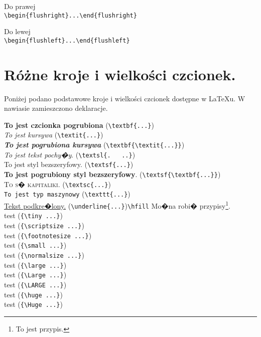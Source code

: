 \documentclass[11pt,wide]{mwart}
\begin{document}
\begin{flushright}
Do prawej\\
\verb"\begin{flushright}...\end{flushright}"
\end{flushright}

\begin{flushleft}
Do lewej\\
\verb"\begin{flushleft}...\end{flushleft}"
\end{flushleft}


\section{Różne kroje i wielkości czcionek.}

Poniżej podano podstawowe kroje i wielkości czcionek dostępne w \LaTeX u.
W nawiasie zamieszczono deklaracje.

%
%
%
%

\noindent
\textbf{To jest czcionka pogrubiona} (\verb+\textbf{...}+)\\
\textit{To jest kursywa} (\verb+\textit{...}+)\\
\textbf{\textit{To jest pogrubiona kursywa}} (\verb+\textbf{\textit{...}}+)\\
\textsl{To jest tekst pochy�y}. (\verb+\textsl{.   ..}+)\\
\textsf{To jest styl bezszeryfowy}. (\verb+\textsf{...}+)\\
\textsf{\textbf{To jest pogrubiony styl bezszeryfowy}}.
(\verb+\textsf{\textbf{...}}+)\\
\textsc{To s� kapitaliki}. (\verb+\textsc{...}+)\\
\texttt{To jest typ maszynowy} (\verb+\texttt{...}+)\\
\underline{Tekst podkre�lony.} (\verb+\underline{...}+)\hfill\verb+\hfill+\hfill
Mo�na robi� przypisy\footnote{To jest przypis.}.\\[3ex] %
{\tiny test} (\verb+{\tiny ...}+)\\                     %
{\scriptsize test} (\verb+{\scriptsize ...}+)\\         %
{\footnotesize test} (\verb+{\footnotesize ...}+)\\     %
{\small test} (\verb+{\small ...}+)\\                   %
{\normalsize test} (\verb+{\normalsize ...}+)\\
{\large test} (\verb+{\large ...}+)\\
{\Large test} (\verb+{\Large ...}+)\\
{\LARGE test} (\verb+{\LARGE ...}+)\\
{\huge test} (\verb+{\huge ...}+)\\
{\Huge test} (\verb+{\Huge ...}+)
\end{document}
